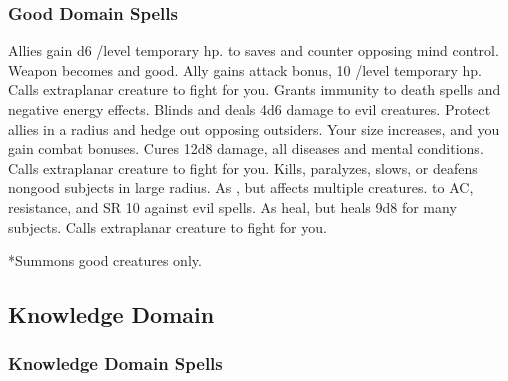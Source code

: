 \subsubsection{Good Domain Spells}
\begin{spelllist}
   Allies gain d6 /level temporary hp.
    to saves and counter opposing mind control.
   Weapon becomes  and good.
  \spellhead[2]{}
   Ally gains  attack bonus, 10 /level temporary hp.
   Calls extraplanar creature to fight for you.
   Grants immunity to death spells and negative energy effects.
   Blinds and deals 4d6 damage to evil creatures.
   Protect allies in a \areamed radius and hedge out opposing outsiders.
   Your size increases, and you gain combat bonuses.
   Cures 12d8 damage, all diseases and mental conditions.
   Calls extraplanar creature to fight for you.
  \F Kills, paralyzes, slows, or deafens nongood subjects in large radius.
  \spellhead[7]{}
   As , but affects multiple creatures.
    to AC,  resistance, and SR 10 against evil spells.
   As heal, but heals 9d8 for many subjects.
   Calls extraplanar creature to fight for you.
\end{spelllist}
*Summons good creatures only.

\subsection{Knowledge Domain}
\subsubsection{Knowledge Domain Spells}
\begin{spelllist}
  \spellhead[1]{}
  \spellhead[2]{}
  \spellhead[8]{}
\end{spelllist}

